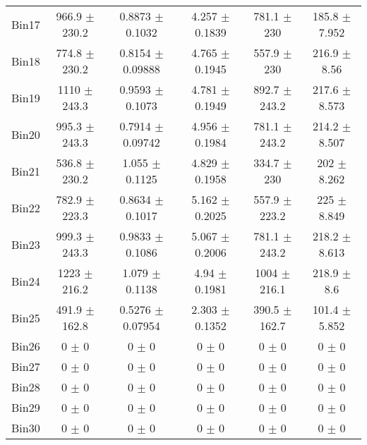 \begin{tabular}{@{\extracolsep{4pt}}lccccc@{}}
     Bin17 & 966.9 $\pm$ 230.2 & 0.8873 $\pm$ 0.1032 & 4.257 $\pm$ 0.1839 & 781.1 $\pm$ 230 & 185.8 $\pm$ 7.952 \\ 
     Bin18 & 774.8 $\pm$ 230.2 & 0.8154 $\pm$ 0.09888 & 4.765 $\pm$ 0.1945 & 557.9 $\pm$ 230 & 216.9 $\pm$ 8.56 \\ 
     Bin19 & 1110 $\pm$ 243.3 & 0.9593 $\pm$ 0.1073 & 4.781 $\pm$ 0.1949 & 892.7 $\pm$ 243.2 & 217.6 $\pm$ 8.573 \\ 
     Bin20 & 995.3 $\pm$ 243.3 & 0.7914 $\pm$ 0.09742 & 4.956 $\pm$ 0.1984 & 781.1 $\pm$ 243.2 & 214.2 $\pm$ 8.507 \\ 
     Bin21 & 536.8 $\pm$ 230.2 & 1.055 $\pm$ 0.1125 & 4.829 $\pm$ 0.1958 & 334.7 $\pm$ 230 & 202 $\pm$ 8.262 \\ 
     Bin22 & 782.9 $\pm$ 223.3 & 0.8634 $\pm$ 0.1017 & 5.162 $\pm$ 0.2025 & 557.9 $\pm$ 223.2 & 225 $\pm$ 8.849 \\ 
     Bin23 & 999.3 $\pm$ 243.3 & 0.9833 $\pm$ 0.1086 & 5.067 $\pm$ 0.2006 & 781.1 $\pm$ 243.2 & 218.2 $\pm$ 8.613 \\ 
     Bin24 & 1223 $\pm$ 216.2 & 1.079 $\pm$ 0.1138 & 4.94 $\pm$ 0.1981 & 1004 $\pm$ 216.1 & 218.9 $\pm$ 8.6 \\ 
     Bin25 & 491.9 $\pm$ 162.8 & 0.5276 $\pm$ 0.07954 & 2.303 $\pm$ 0.1352 & 390.5 $\pm$ 162.7 & 101.4 $\pm$ 5.852 \\ 
     Bin26 & 0 $\pm$ 0 & 0 $\pm$ 0 & 0 $\pm$ 0 & 0 $\pm$ 0 & 0 $\pm$ 0 \\ 
     Bin27 & 0 $\pm$ 0 & 0 $\pm$ 0 & 0 $\pm$ 0 & 0 $\pm$ 0 & 0 $\pm$ 0 \\ 
     Bin28 & 0 $\pm$ 0 & 0 $\pm$ 0 & 0 $\pm$ 0 & 0 $\pm$ 0 & 0 $\pm$ 0 \\ 
     Bin29 & 0 $\pm$ 0 & 0 $\pm$ 0 & 0 $\pm$ 0 & 0 $\pm$ 0 & 0 $\pm$ 0 \\ 
     Bin30 & 0 $\pm$ 0 & 0 $\pm$ 0 & 0 $\pm$ 0 & 0 $\pm$ 0 & 0 $\pm$ 0 \\ 
\hline\hline
  \end{tabular}
